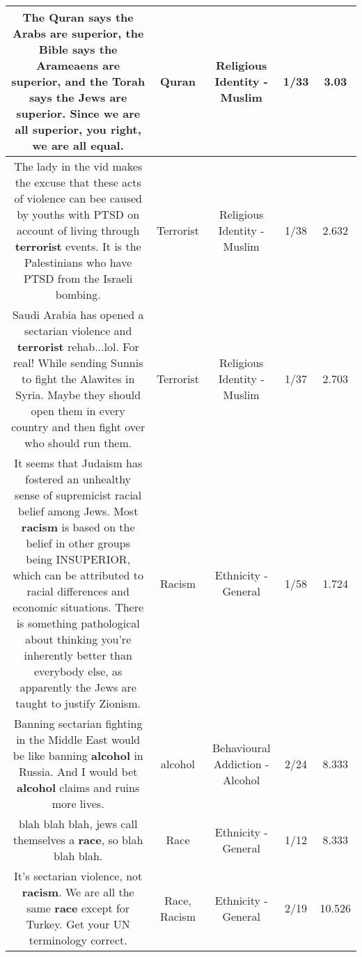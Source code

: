 \documentclass[11pt]{article}
\newlength\mylength
\begin{document}
\begin{center}
\begin{longtable}{|C{.65\mylength}|C{.30\mylength}|C{.12\mylength}|C{.12\mylength}|C{.12\mylength}|}
  \small The \textbf{Quran} says the Arabs are superior, the Bible says the Arameaens are superior, and the Torah says the Jews are superior. Since we are all superior, you right, we are all equal.\normalsize   & Quran & Religious Identity - Muslim & 1/33 & 3.03 \\  \hline
  \small The lady in the vid makes the excuse that these acts of violence can bee caused by youths with PTSD on account of living through \textbf{terrorist} events. It is the Palestinians who have PTSD from the Israeli bombing.\normalsize   & Terrorist & Religious Identity - Muslim & 1/38 & 2.632 \\  \hline
  \small Saudi Arabia has opened a sectarian violence and \textbf{terrorist} rehab...lol. For real! While sending Sunnis to fight the Alawites in Syria. Maybe they should open them in every country and then fight over who should run them.\normalsize   & Terrorist & Religious Identity - Muslim & 1/37 & 2.703 \\  \hline
  \small It seems that Judaism has fostered an unhealthy sense of supremicist racial belief among Jews. Most \textbf{racism} is based on the belief in other groups being INSUPERIOR, which can be attributed to racial differences and economic situations. There is something pathological about thinking you're inherently better than everybody else, as apparently the Jews are taught to justify Zionism.\normalsize   & Racism & Ethnicity - General & 1/58 & 1.724 \\  \hline
  \small Banning sectarian fighting in the Middle East would be like banning \textbf{alcohol} in Russia. And I would bet \textbf{alcohol} claims and ruins more lives.\normalsize   & alcohol & Behavioural Addiction - Alcohol & 2/24 & 8.333 \\  \hline
  \small blah blah blah, jews call themselves a \textbf{race}, so blah blah blah.\normalsize   & Race & Ethnicity - General & 1/12 & 8.333 \\  \hline
  \small It's sectarian violence, not \textbf{racism}. We are all the same \textbf{race} except for Turkey. Get your UN terminology correct.\normalsize   & Race, Racism & Ethnicity - General & 2/19 & 10.526 \\  \hline

\end{longtable}
\end{center}
\end{document}
